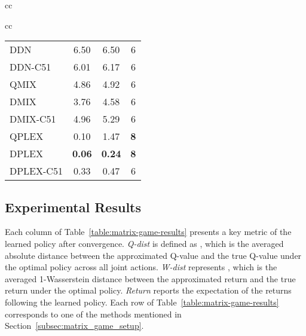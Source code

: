 \documentclass[twoside,11pt]{article}
\begin{document}
\begin{figure*}[t]
\begin{tabular}{cc}
\begin{tabular}{cc}
\begin{minipage}{0.45\textwidth}
\begin{tabular}{l|c|c|c}
DDN & 6.50 & 6.50 & 6 \\
DDN-C51 & 6.01 & 6.17 & 6 \\
\hline
QMIX & 4.86 & 4.92 & 6 \\
DMIX & 3.76 & 4.58 & 6 \\
DMIX-C51 & 4.96 & 5.29 & 6 \\
\hline
QPLEX & 0.10 & 1.47 & \textbf{8} \\
DPLEX & \textbf{0.06} & \textbf{0.24} & \textbf{8} \\
DPLEX-C51 & 0.33 & 0.47 & 6 \\
\bottomrule
\end{tabular}
\label{table:matrix-game-results}
\end{minipage}
\end{tabular}
\end{tabular}
\end{figure*}
 


\subsection{Experimental Results}

Each column of Table~\ref{table:matrix-game-results} presents a key metric of the learned policy after convergence. \textit{Q-dist} is defined as , which is the averaged absolute distance between the approximated Q-value  and the true Q-value  under the optimal policy across all joint actions. \textit{W-dist} represents , which is the averaged 1-Wasserstein distance between the approximated return  and the true return  under the optimal policy. \textit{Return} reports the expectation of the returns following the learned policy.
Each row of Table~\ref{table:matrix-game-results} corresponds to one of the methods mentioned in Section~\ref{subsec:matrix_game_setup}.
\end{document}
